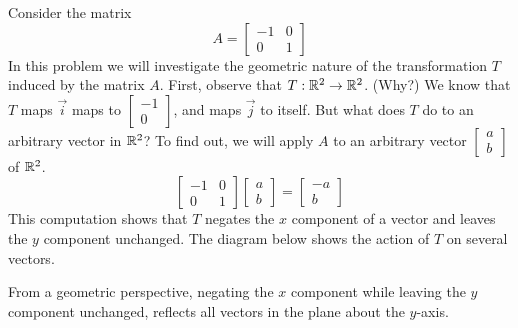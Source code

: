 \documentclass{ximera}
\begin{document}
\begin{exploration}\label{init:matrixtransgeometry1}
Consider the matrix
$$A=\begin{bmatrix}-1&0\\0&1\end{bmatrix}$$
In this problem we will investigate the geometric nature of the transformation $T$ induced by the matrix $A$.  First, observe that $T:\mathbb{R}^2\rightarrow\mathbb{R}^2$.  (Why?)  We know that $T$ maps $\vec{i}$ maps to $\begin{bmatrix}-1\\0\end{bmatrix}$, and maps $\vec{j}$ to itself.  But what does $T$ do to an arbitrary vector in $\mathbb{R}^2$?  To find out, we will apply $A$ to an arbitrary vector $\begin{bmatrix}a\\b\end{bmatrix}$ of $\mathbb{R}^2$.
$$\begin{bmatrix}-1&0\\0&1\end{bmatrix}\begin{bmatrix}a\\b\end{bmatrix}=\begin{bmatrix}-a\\b\end{bmatrix}$$
This computation shows that $T$ negates the $x$ component of a vector and leaves the $y$ component unchanged.  The diagram below shows the action of $T$ on several vectors.  

\begin{center}
\end{center}

From a geometric perspective, negating the $x$ component while leaving the $y$ component unchanged, reflects all vectors in the plane about the $y$-axis.
\end{exploration}
\end{document}
